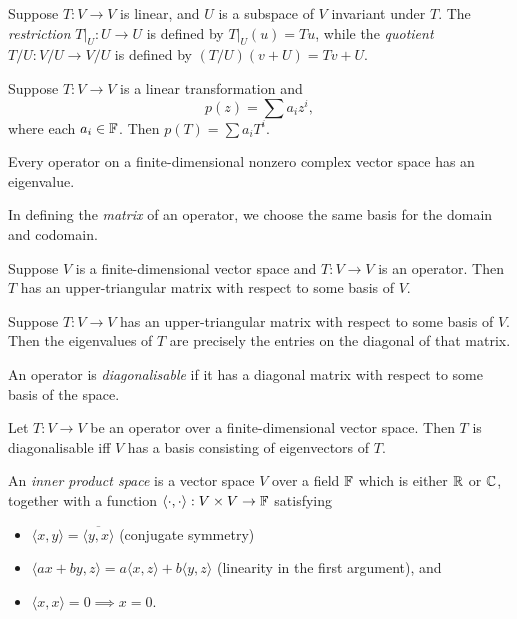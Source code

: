 \begin{defn}
  Suppose $T:V\to V$ is linear, and $U$ is a subspace of $V$ invariant under
  $T$. The \emph{restriction} $T|_U:U\to U$ is defined by $T|_U(u)=Tu$, while
  the \emph{quotient} $T/U:V/U\to V/U$ is defined by $(T/U)(v+U)=Tv+U$.
\end{defn}
\begin{defn}
  Suppose $T:V\to V$ is a linear transformation and
  \[p(z)=\sum a_i z^i,\] where each $a_i\in\mathbb{F}$. Then $p(T)=\sum a_i T^i$.
\end{defn}
\begin{thm}
  Every operator on a finite-dimensional nonzero complex vector space has an
  eigenvalue.
\end{thm}
\begin{defn}
  In defining the \emph{matrix} of an operator, we choose the same basis for the
  domain and codomain.
\end{defn}
\begin{prop}
  Suppose $V$ is a finite-dimensional vector space and $T:V\to V$ is an
  operator. Then $T$ has an upper-triangular matrix with respect to some basis
  of $V$.
\end{prop}
\begin{prop}
  Suppose $T:V\to V$ has an upper-triangular matrix with respect to some basis
  of $V$. Then the eigenvalues of $T$ are precisely the entries on the diagonal
  of that matrix.
\end{prop}
\begin{defn}
  An operator is \emph{diagonalisable} if it has a diagonal
  matrix with respect to some basis of the space.
\end{defn}
\begin{prop}
  Let $T:V\to V$ be an operator over a finite-dimensional vector space.
  Then $T$ is diagonalisable iff $V$ has a basis
  consisting of eigenvectors of $T$.
\end{prop}
\begin{defn}
  An \emph{inner product space} is a vector space $V$ over a field $\mathbb{F}$ which
  is either $\mathbb{R}$ or $\mathbb{C}$, together with a function
  $\langle\cdot,\cdot\rangle:V\times V\to\mathbb{F}$ satisfying
  \begin{itemize}
    \item $\langle  x, y\rangle=\overline{\langle 
      y, x\rangle}$ (conjugate
      symmetry)
    \item $\langle a x+b y, z\rangle=a\langle
      x, z\rangle+b\langle y, z\rangle$ (linearity in the
      first argument), and
    \item $\langle x, x\rangle=0\implies x= 0$.
  \end{itemize}
\end{defn}
